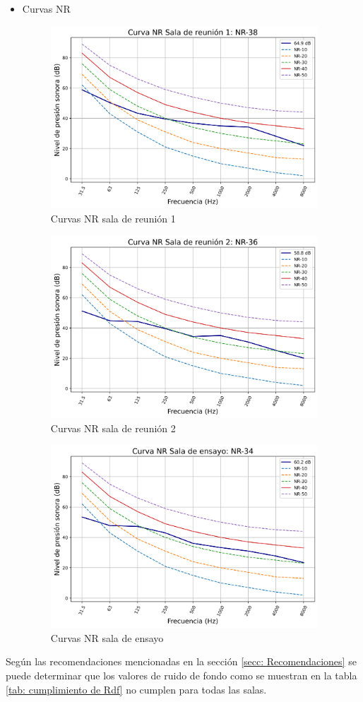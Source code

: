 \begin{itemize}
    \item Curvas NR
    \begin{figure}[H]
        \centering
        \includegraphics[width=10cm]{Imagenes/Resultados/Curvas NC-NR/NR reunion 1.png}
        \caption{Curvas NR sala de reunión 1}
        \label{fig: Curvas NR sala 1}
    \end{figure}

    \begin{figure}[H]
        \centering
        \includegraphics[width=10cm]{Imagenes/Resultados/Curvas NC-NR/NR reunion 2.png}
        \caption{Curvas NR sala de reunión 2}
        \label{fig: Curvas NR sala 2}
    \end{figure}

    \begin{figure}[H]
        \centering
        \includegraphics[width=10cm]{Imagenes/Resultados/Curvas NC-NR/NR ensayo.png}
        \caption{Curvas NR sala de ensayo}
        \label{fig: Curvas NR sala de ensayo}
    \end{figure}
\end{itemize}
Según las recomendaciones mencionadas en la sección \ref{secc: Recomendaciones} se puede determinar que los valores de ruido de fondo como se muestran en la tabla \ref{tab: cumplimiento de Rdf} no cumplen para todas las salas.

